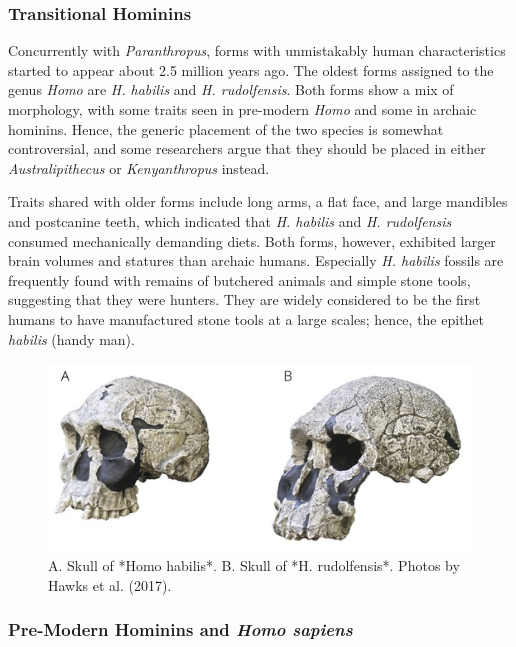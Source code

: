 \documentclass[
]{book}
\begin{document}
\hypertarget{transitional-hominins}{%
\subsubsection*{Transitional Hominins}\label{transitional-hominins}}

Concurrently with \emph{Paranthropus}, forms with unmistakably human characteristics started to appear about 2.5 million years ago. The oldest forms assigned to the genus \emph{Homo} are \emph{H. habilis} and \emph{H. rudolfensis}. Both forms show a mix of morphology, with some traits seen in pre-modern \emph{Homo} and some in archaic hominins. Hence, the generic placement of the two species is somewhat controversial, and some researchers argue that they should be placed in either \emph{Australipithecus} or \emph{Kenyanthropus} instead.

Traits shared with older forms include long arms, a flat face, and large mandibles and postcanine teeth, which indicated that \emph{H. habilis} and \emph{H. rudolfensis} consumed mechanically demanding diets. Both forms, however, exhibited larger brain volumes and statures than archaic humans. Especially \emph{H. habilis} fossils are frequently found with remains of butchered animals and simple stone tools, suggesting that they were hunters. They are widely considered to be the first humans to have manufactured stone tools at a large scales; hence, the epithet \emph{habilis} (handy man).

\begin{figure}
\includegraphics[width=1\linewidth]{images/transitional} \caption{A. Skull of *Homo habilis*. B. Skull of *H. rudolfensis*. Photos by Hawks et al. (2017).}\label{fig:transitional}
\end{figure}

\hypertarget{pre-modern-hominins-and-homo-sapiens}{%
\subsubsection*{\texorpdfstring{Pre-Modern Hominins and \emph{Homo sapiens}}{Pre-Modern Hominins and Homo sapiens}}\label{pre-modern-hominins-and-homo-sapiens}}
\end{document}
